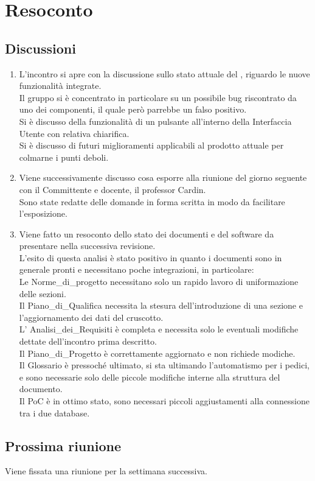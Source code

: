 \section{Resoconto} \label{sec:resoconto}
\subsection{Discussioni} \label{subsec:resdiscussione}
\begin{enumerate}
    \item L'incontro si apre con la discussione sullo stato attuale del , riguardo le nuove funzionalità integrate. \\Il gruppo si è concentrato in particolare su un possibile bug riscontrato da uno dei componenti, il quale però parrebbe un falso positivo. \\Si è discusso della funzionalità di un pulsante all'interno della Interfaccia Utente con relativa chiarifica. \\Si è discusso di futuri miglioramenti applicabili al prodotto attuale per colmarne i punti deboli.
    \item Viene successivamente discusso cosa esporre alla riunione del giorno seguente con il Committente e docente, il professor Cardin. \\Sono state redatte delle domande in forma scritta in modo da facilitare l'esposizione.
    \item Viene fatto un resoconto dello stato dei documenti e del software da presentare nella successiva revisione.\\L'esito di questa analisi è stato positivo in quanto i documenti sono in generale pronti e necessitano poche integrazioni, in particolare: \\Le Norme\_di\_progetto necessitano solo un rapido lavoro di uniformazione delle sezioni. \\Il Piano\_di\_Qualifica necessita la stesura dell'introduzione di una sezione e l'aggiornamento dei dati del cruscotto. \\L' Analisi\_dei\_Requisiti è completa e necessita solo le eventuali modifiche dettate dell'incontro prima descritto. \\Il Piano\_di\_Progetto è correttamente aggiornato e non richiede modiche. \\Il Glossario è pressoché ultimato, si sta ultimando l'automatismo per i pedici, e sono necessarie solo delle piccole modifiche interne alla struttura del documento.\\Il PoC è in ottimo stato, sono necessari piccoli aggiustamenti alla connessione tra i due database.
\end{enumerate}


\subsection{Prossima riunione} \label{subsec:riunione}
Viene fissata una riunione per la settimana successiva.